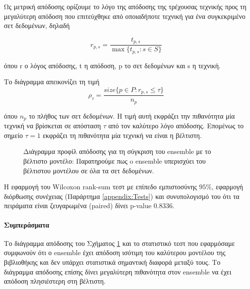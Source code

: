 Ως μετρική απόδοσης ορίζουμε το λόγο της απόδοσης της τρέχουσας τεχνικής προς τη μεγαλύτερη απόδοση που επιτεύχθηκε από οποιαδήποτε τεχνική για ένα συγκεκριμένο σετ δεδομένων, δηλαδή

\begin{equation}
r_{p,s}= \frac{t_{p,s}}{\max\{{t_{p,s} : s \in S}\}}    
\end{equation} 

όπου r ο λόγος απόδοσης, t η απόδοση, p το σετ δεδομένων και s η τεχνική.

Το διάγραμμα απεικονίζει τη τιμή
\begin{equation}
\rho_{\tau}= \frac{size\{{p \in P : r_{p,s} \leq \tau  }\}}{n_p}   
\end{equation}

όπου $n_p$ το πλήθος των σετ δεδομένων. Η τιμή αυτή εκφράζει την πιθανότητα μία τεχνική να βρίσκεται σε απόσταση $\tau$ από τον καλύτερο λόγο απόδοσης.  Επομένως το σημείο $\tau = 1$ εκφράζει τη πιθανότητα μία τεχνική να είναι η βέλτιστη.

\begin{figure}[!htb]
	\scalebox{0.75}{
	}
		\caption[Διάγραμμα προφίλ απόδοσης για τη σύγκριση του ensemble με το βέλτιστο μοντέλο]{Διάγραμμα προφίλ απόδοσης για τη σύγκριση του ensemble με το βέλτιστο μοντέλο: Παρατηρούμε πως o ensemble υπερισχύει του βέλτιστου μοντέλου σε όλα τα σετ δεδομένων. }
		\label{fig:ensprof}
\end{figure}

Η εφαρμογή του Wilcoxon rank-sum τεστ με επίπεδο εμπιστοσύνης $95\%$, εφαρμογή διόρθωσης συνέχειας (Παράρτημα \ref{appendix:Tests}) και συνυπολογισμό του ότι τα πειράματα είναι ζευγαρωμένα (paired) δίνει p-value 0.8336.  

\paragraph{Συμπεράσματα}
Το διάγραμμα απόδοσης του Σχήματος \ref{fig:ensprof} και το στατιστικό τεστ που εφαρμόσαμε συμφωνούν ότι ο ensemble έχει απόδοση ισότιμη του καλύτερου μοντέλου της βιβλιοθήκης και δεν υπάρχει στατιστικά σημαντική διαφορά μεταξύ τους. Το διάγραμμα απόδοσης επίσης δίνει μεγαλύτερη πιθανότητα στον ensemble να έχει απόδοση πλησιέστερη στη βέλτιστη.
 
